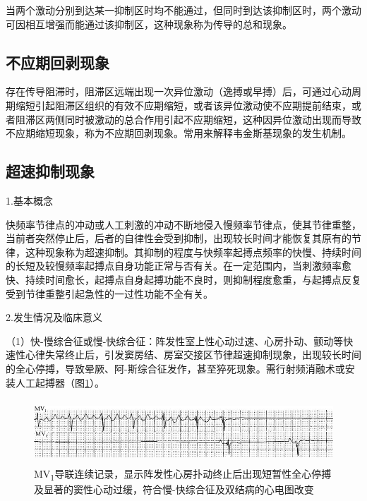当两个激动分别到达某一抑制区时均不能通过，但同时到达该抑制区时，两个激动可因相互增强而能通过该抑制区，这种现象称为传导的总和现象。

\protect\hypertarget{text00047.htmlux5cux23subid544}{}{}

\subsection{不应期回剥现象}

存在传导阻滞时，阻滞区远端出现一次异位激动（逸搏或早搏）后，可通过心动周期缩短引起阻滞区组织的有效不应期缩短，或者该异位激动使不应期提前结束，或者阻滞区两侧同时被激动的总合作用引起不应期缩短，这种因异位激动出现而导致不应期缩短现象，称为不应期回剥现象。常用来解释韦金斯基现象的发生机制。

\protect\hypertarget{text00047.htmlux5cux23subid545}{}{}

\subsection{超速抑制现象}

1.基本概念

快频率节律点的冲动或人工刺激的冲动不断地侵入慢频率节律点，使其节律重整，当前者突然停止后，后者的自律性会受到抑制，出现较长时间才能恢复其原有的节律，这种现象称为超速抑制。其抑制的程度与快频率起搏点频率的快慢、持续时间的长短及较慢频率起搏点自身功能正常与否有关。在一定范围内，当刺激频率愈快、持续时间愈长，起搏点自身起搏功能不良时，则抑制程度愈重，与起搏点反复受到节律重整引起急性的一过性功能不全有关。

2.发生情况及临床意义

（1）快-慢综合征或慢-快综合征：阵发性室上性心动过速、心房扑动、颤动等快速性心律失常终止后，引发窦房结、房室交接区节律超速抑制现象，出现较长时间的全心停搏，导致晕厥、阿-斯综合征发作，甚至猝死现象。需行射频消融术或安装人工起搏器（图\ref{fig40-10}）。

\begin{figure}[!htbp]
 \centering
 \includegraphics[width=5.58333in,height=0.94792in]{./images/Image00671.jpg}
 \captionsetup{justification=centering}
 \caption{MV\textsubscript{1}导联连续记录，显示阵发性心房扑动终止后出现短暂性全心停搏及显著的窦性心动过缓，符合慢-快综合征及双结病的心电图改变}
 \label{fig40-10}
  \end{figure} 


